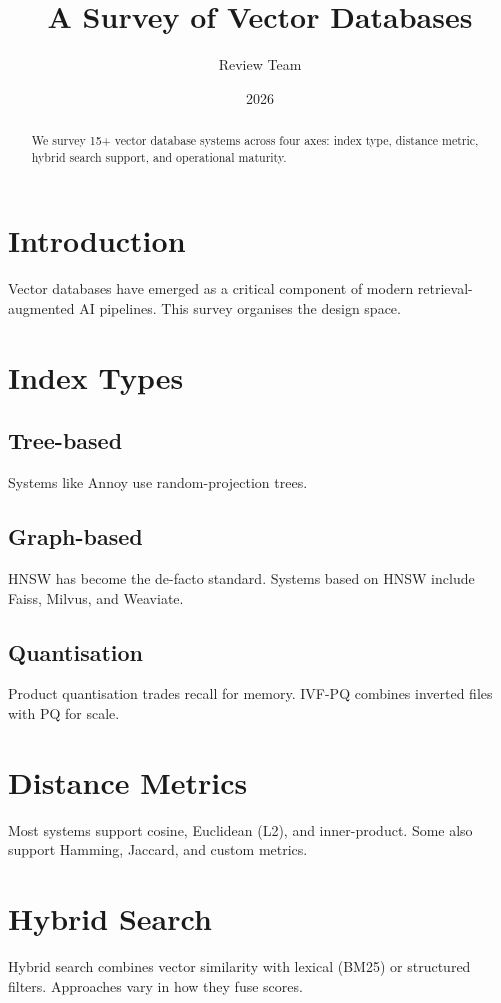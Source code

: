\documentclass{article}
\title{A Survey of Vector Databases}
\author{Review Team}
\date{2026}
\begin{document}
\maketitle

\begin{abstract}
We survey 15+ vector database systems across four axes: index type, distance metric, hybrid search support, and operational maturity.
\end{abstract}

\section{Introduction}
Vector databases have emerged as a critical component of modern retrieval-augmented AI pipelines. This survey organises the design space.

\section{Index Types}

\subsection{Tree-based}
Systems like Annoy use random-projection trees.

\subsection{Graph-based}
HNSW has become the de-facto standard. Systems based on HNSW include Faiss, Milvus, and Weaviate.

\subsection{Quantisation}
Product quantisation trades recall for memory. IVF-PQ combines inverted files with PQ for scale.

\section{Distance Metrics}
Most systems support cosine, Euclidean (L2), and inner-product. Some also support Hamming, Jaccard, and custom metrics.

\section{Hybrid Search}
Hybrid search combines vector similarity with lexical (BM25) or structured filters. Approaches vary in how they fuse scores.
\end{document}
